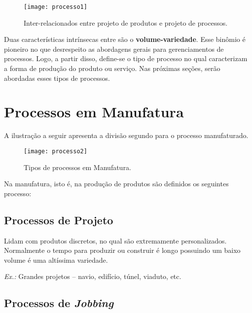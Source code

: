 		\begin{figure}[h]
			\centering
			\texttt{[image: processo1]}
			\caption[Inter-relacionados entre projeto de produtos e projeto de processos]{Inter-relacionados entre projeto de produtos e projeto de processos.}
			\label{fig:processo1}
		\end{figure}

		Duas características intrínsecas entre são o \textbf{volume-variedade}. Esse binômio é pioneiro no que desrespeito as abordagens gerais para gerenciamentos de processos. Logo, a partir disso, define-se o tipo de processo no qual caracterizam a forma de produção do produto ou serviço. Nas próximas seções, serão abordadas esses tipos de processos.

		\section[Processos em Manufatura]{Processos em Manufatura}
		\label{sec:processos_manufatura}
			
			A ilustração a seguir apresenta a divisão segundo \cite{slack} para o processo manufaturado.

			\begin{figure}[h]
				\centering
				\texttt{[image: processo2]}
				\caption[Tipos de processos em Manufatura]{Tipos de processos em Manufatura.}
				\label{fig:processo2}
			\end{figure}

			Na manufatura, isto é, na produção de produtos são definidos os seguintes processo:

			\subsection[Processos de Projeto]{Processos de Projeto}
			\label{sec:processos_manufatura_projeto}

				Lidam com produtos discretos, no qual são extremamente personalizados. Normalmente o tempo para produzir ou construir é longo possuindo um baixo volume é uma altíssima variedade.
				
				\emph{Ex.:} Grandes projetos – navio, edifício, túnel, viaduto, etc.

			\subsection[Processos de Jobbing]{Processos de \emph{Jobbing}}
			\label{sec:processos_manufatura_jobbing}

